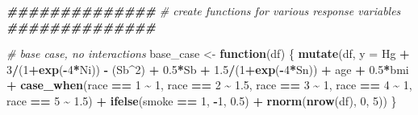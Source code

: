 \documentclass[12pt, twoside]{amherstthesis}
\newenvironment{Shaded}{\begin{snugshade}}{\end{snugshade}}
\newcommand{\AttributeTok}[1]{\textcolor[rgb]{0.13,0.29,0.53}{#1}}
\newcommand{\CommentTok}[1]{\textcolor[rgb]{0.56,0.35,0.01}{\textit{#1}}}
\newcommand{\ControlFlowTok}[1]{\textcolor[rgb]{0.13,0.29,0.53}{\textbf{#1}}}
\newcommand{\DecValTok}[1]{\textcolor[rgb]{0.00,0.00,0.81}{#1}}
\newcommand{\DocumentationTok}[1]{\textcolor[rgb]{0.56,0.35,0.01}{\textbf{\textit{#1}}}}
\newcommand{\FloatTok}[1]{\textcolor[rgb]{0.00,0.00,0.81}{#1}}
\newcommand{\FunctionTok}[1]{\textcolor[rgb]{0.13,0.29,0.53}{\textbf{#1}}}
\newcommand{\NormalTok}[1]{#1}
\newcommand{\OtherTok}[1]{\textcolor[rgb]{0.56,0.35,0.01}{#1}}
\newcommand{\SpecialCharTok}[1]{\textcolor[rgb]{0.81,0.36,0.00}{\textbf{#1}}}
\begin{document}
\scriptsize
\begin{Shaded}
\begin{Highlighting}[]
\DocumentationTok{\#\#\#\#\#\#\#\#\#\#\#\#\#\#}
\CommentTok{\# create functions for various response variables}
\DocumentationTok{\#\#\#\#\#\#\#\#\#\#\#\#\#\#}

\CommentTok{\# base case, no interactions}
\NormalTok{base\_case }\OtherTok{\textless{}{-}} \ControlFlowTok{function}\NormalTok{(df) \{}
  \FunctionTok{mutate}\NormalTok{(df, }\AttributeTok{y =} 
\NormalTok{           Hg }\SpecialCharTok{+} \DecValTok{3}\SpecialCharTok{/}\NormalTok{(}\DecValTok{1}\SpecialCharTok{+}\FunctionTok{exp}\NormalTok{(}\SpecialCharTok{{-}}\DecValTok{4}\SpecialCharTok{*}\NormalTok{Ni)) }\SpecialCharTok{{-}}\NormalTok{ (Sb}\SpecialCharTok{\^{}}\DecValTok{2}\NormalTok{) }\SpecialCharTok{+} \FloatTok{0.5}\SpecialCharTok{*}\NormalTok{Sb }\SpecialCharTok{+} \FloatTok{1.5}\SpecialCharTok{/}\NormalTok{(}\DecValTok{1}\SpecialCharTok{+}\FunctionTok{exp}\NormalTok{(}\SpecialCharTok{{-}}\DecValTok{4}\SpecialCharTok{*}\NormalTok{Sn)) }\SpecialCharTok{+} 
\NormalTok{           age }\SpecialCharTok{+} \FloatTok{0.5}\SpecialCharTok{*}\NormalTok{bmi }\SpecialCharTok{+} 
           \FunctionTok{case\_when}\NormalTok{(race }\SpecialCharTok{==} \DecValTok{1} \SpecialCharTok{\textasciitilde{}} \DecValTok{1}\NormalTok{, }
\NormalTok{                     race }\SpecialCharTok{==} \DecValTok{2} \SpecialCharTok{\textasciitilde{}} \FloatTok{1.5}\NormalTok{, }
\NormalTok{                     race }\SpecialCharTok{==} \DecValTok{3} \SpecialCharTok{\textasciitilde{}} \DecValTok{1}\NormalTok{, }
\NormalTok{                     race }\SpecialCharTok{==} \DecValTok{4} \SpecialCharTok{\textasciitilde{}} \DecValTok{1}\NormalTok{, }
\NormalTok{                     race }\SpecialCharTok{==} \DecValTok{5} \SpecialCharTok{\textasciitilde{}} \FloatTok{1.5}\NormalTok{) }\SpecialCharTok{+}
           \FunctionTok{ifelse}\NormalTok{(smoke }\SpecialCharTok{==} \DecValTok{1}\NormalTok{, }\SpecialCharTok{{-}}\DecValTok{1}\NormalTok{, }\FloatTok{0.5}\NormalTok{) }\SpecialCharTok{+}
           \FunctionTok{rnorm}\NormalTok{(}\FunctionTok{nrow}\NormalTok{(df), }\DecValTok{0}\NormalTok{, }\DecValTok{5}\NormalTok{))}
\NormalTok{\}}


\end{Highlighting}
\end{Shaded}
\end{document}
